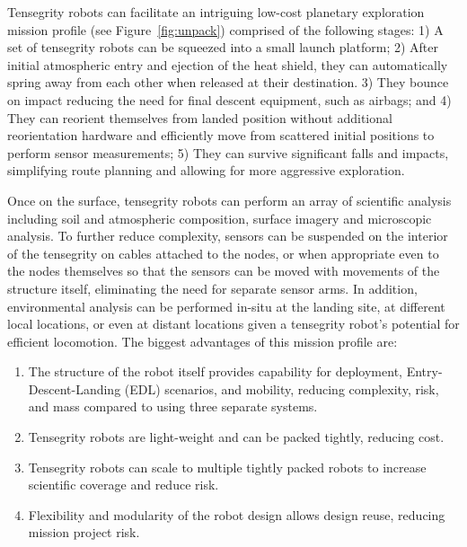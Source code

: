 Tensegrity robots can facilitate an intriguing low-cost planetary exploration mission profile (see Figure~\ref{fig:unpack}) comprised of the following stages:  1) A set of tensegrity robots can be squeezed into a small launch platform; 2)  After initial atmospheric entry and ejection of the heat shield, they can automatically spring away from each other when released at their destination. 3) They bounce on impact reducing the need for final descent equipment, such as airbags; and 4) They can reorient themselves from landed position without additional reorientation hardware and efficiently move from scattered initial positions to perform sensor measurements; 5) They can survive significant falls and impacts, simplifying route planning and allowing for more aggressive exploration.

Once on the surface, tensegrity robots can perform an array of scientific analysis including soil and atmospheric composition, surface imagery and microscopic analysis. To further reduce complexity, sensors can be suspended on the interior of the tensegrity on cables attached to the nodes, or when appropriate even to the nodes themselves so that the sensors can be moved with movements of the structure itself, eliminating the need for separate sensor arms. In addition, environmental analysis can be performed in-situ at the landing site, at different local locations, or even at distant locations given a tensegrity robot's potential for efficient locomotion. The biggest advantages of this mission profile are:
\begin{enumerate}[leftmargin=.5cm]
\item The structure of the robot itself provides capability for deployment, Entry-Descent-Landing (EDL) scenarios, and mobility, reducing complexity, risk, and mass compared to using three separate systems.
\item Tensegrity robots are light-weight and can be packed tightly, reducing cost.
\item Tensegrity robots can scale to multiple tightly packed robots to increase scientific coverage and reduce risk.
\item Flexibility and modularity of the robot design allows design reuse, reducing mission project risk.
\end{enumerate}

